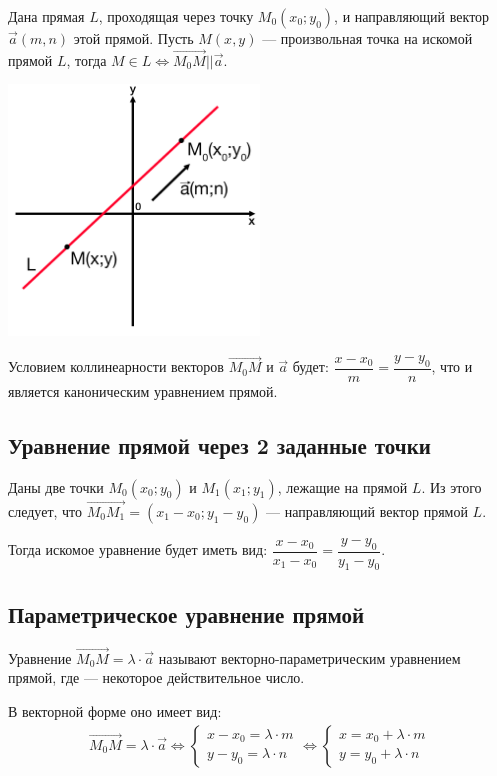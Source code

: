 \documentclass[a4paper,12pt]{extbook}
\theoremstyle{named}
\theoremstyle{named}
\begin{document}
Дана прямая \(L\), проходящая через точку \(M_0(x_0;y_0)\), и направляющий вектор \(\overrightarrow{a}(m, n)\) этой прямой.
Пусть \(M(x, y)\) — произвольная точка на искомой прямой \(L\), тогда \(M \in L \iff \overrightarrow{M_0M} || \overrightarrow{a}\).

\begin{center}
    \includegraphics[width=0.5\textwidth]{kanon_line.png}
\end{center}

Условием коллинеарности векторов \(\overrightarrow{M_0M}\) и \(\overrightarrow{a}\) будет:
\(\dfrac{x - x_0}{m} = \dfrac{y - y_0}{n}\), что и является каноническим уравнением прямой.

\subsection*{Уравнение прямой через 2 заданные точки}

Даны две точки \(M_0(x_0;y_0)\) и \(M_1(x_1;y_1)\), лежащие на прямой \(L\).
Из этого следует, что \(\overrightarrow{M_0M_1} = (x_1 - x_0; y_1 - y_0)\) — направляющий вектор прямой \(L\).

Тогда искомое уравнение будет иметь вид: \(\dfrac{x - x_0}{x_1 - x_0} = \dfrac{y - y_0}{y_1 - y_0}\).

\subsection*{Параметрическое уравнение прямой}

Уравнение \(\overrightarrow{M_0M} = \lambda \cdot \overrightarrow{a}\) называют векторно-параметрическим уравнением прямой, где \lambda — некоторое действительное число.

В векторной форме оно имеет вид:
\begin{gather*}
    \overrightarrow{M_0M} = \lambda \cdot \overrightarrow{a} \iff
    \begin{cases}
        x - x_0 = \lambda \cdot m \\
        y - y_0 = \lambda \cdot n
    \end{cases}
    \iff
    \begin{cases}
        x = x_0 + \lambda \cdot m \\
        y = y_0 + \lambda \cdot n
    \end{cases}
\end{gather*}
\end{document}
